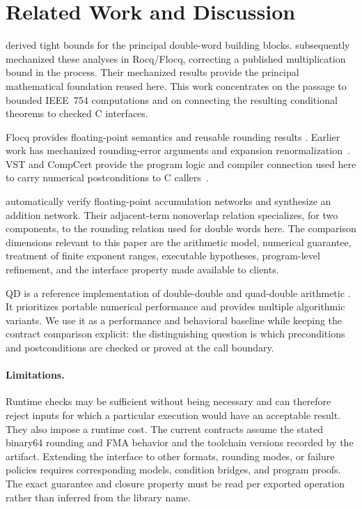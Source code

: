 \section{Related Work and Discussion}
\label{sec:related}

\citet{Joldes2017} derived tight bounds for the principal double-word building
blocks.  \citet{Rideau2022} subsequently mechanized these analyses in
Rocq/Flocq, correcting a published multiplication bound in the process.  Their
mechanized results provide the principal
mathematical foundation reused here.  This work concentrates on the passage to
bounded IEEE~754 computations and on connecting the resulting conditional
theorems to checked C interfaces.

Flocq provides floating-point semantics and reusable rounding results
\cite{Boldo2011}.  Earlier work has mechanized rounding-error arguments and
expansion renormalization~\cite{Roux2014,Boldo2015}.  VST and CompCert provide
the program logic and compiler connection used here to carry numerical
postconditions to C callers~\cite{Appel2014}.

\citet{Zhang2025} automatically verify floating-point accumulation networks and
synthesize an addition network.  Their adjacent-term
nonoverlap relation specializes, for two components, to the rounding relation
used for double words here.  The comparison dimensions relevant to this paper
are the arithmetic model, numerical guarantee, treatment of finite exponent
ranges, executable hypotheses, program-level refinement, and the interface
property made available to clients.

QD is a reference implementation of double-double and quad-double arithmetic
\cite{QD}.  It prioritizes portable numerical performance and provides
multiple algorithmic variants.  We use it as a performance and behavioral
baseline while keeping the contract comparison explicit: the distinguishing
question is which preconditions and postconditions are checked or proved at the
call boundary.

\paragraph{Limitations.}
Runtime checks may be sufficient without being necessary and can therefore
reject inputs for which a particular execution would have an acceptable
result.  They also impose a runtime cost.  The current contracts assume the
stated binary64 rounding and FMA behavior and the toolchain versions recorded
by the artifact.  Extending the interface to other formats, rounding modes, or
failure policies requires corresponding models, condition bridges, and program
proofs.  The exact guarantee and closure property must be read per exported
operation rather than inferred from the library name.
